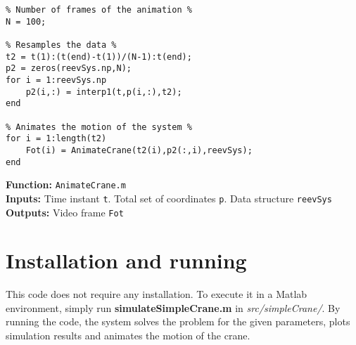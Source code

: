 \begin{tcolorbox}{\begin{lstlisting}[style=Matlab-editor]
% Animation of crane motion %
% Number of frames of the animation %
N = 100;

% Resamples the data %
t2 = t(1):(t(end)-t(1))/(N-1):t(end);
p2 = zeros(reevSys.np,N);
for i = 1:reevSys.np
    p2(i,:) = interp1(t,p(i,:),t2);
end

% Animates the motion of the system %
for i = 1:length(t2)
    Fot(i) = AnimateCrane(t2(i),p2(:,i),reevSys);
end
\end{lstlisting}}
\end{tcolorbox}

\setlength{\parindent}{0cm}
\textbf{Function:} \texttt{AnimateCrane.m} \\
\textbf{Inputs:} Time instant \texttt{t}. Total set of coordinates \texttt{p}. Data structure \texttt{reevSys} \\
\textbf{Outputs:} Video frame \texttt{Fot} \\


\section{Installation and running}
 This code does not require any installation. To execute it in a Matlab environment, simply run \textbf{simulateSimpleCrane.m} in \textit{src/simpleCrane/}. By running the code, the system solves the problem for the given parameters, plots simulation results and animates the motion of the crane. 


\begin{comment}
\subsection{m-files description}
\texttt{CalculateAllCoordinates}: The main structure of the code can be found in 

\textbf{Parameters} The set of the coordinates of the reeving system \texttt{p}, time vector \texttt{t}, and the parameters of the system as \texttt{reevSys}.

\textbf{Returns} The animation of the simulation
\end{comment}



